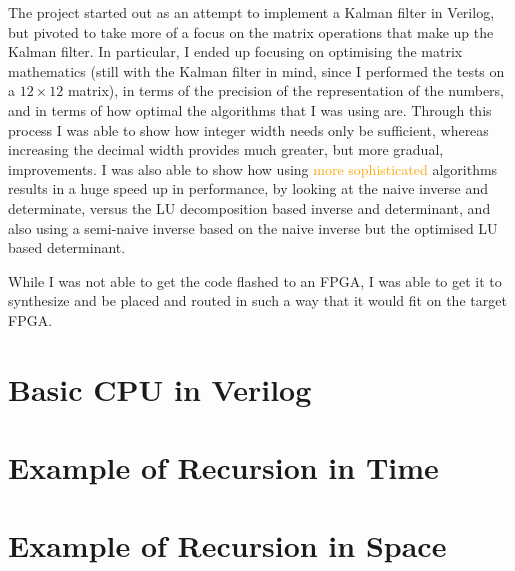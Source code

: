 \documentclass[12pt]{article}
\newcommand{\change}[2][]{\textcolor{orange}{#2}}
\begin{document}
The project started out as an attempt to implement a Kalman filter in Verilog, but pivoted to take more of a focus on the matrix operations that make up the Kalman filter. In particular, I ended up focusing on optimising the matrix mathematics (still with the Kalman filter in mind, since I performed the tests on a $12 \times 12$ matrix), in terms of the precision of the representation of the numbers, and in terms of how optimal the algorithms that I was using are. Through this process I was able to show how integer width needs only be sufficient, whereas increasing the decimal width provides much greater, but more gradual, improvements. I was also able to show how using \change[was "the correct" for which my concern is it sounds like the alternative is incorrect algorithms, which is not what you were referring to]{more sophisticated} algorithms results in a huge speed up in performance, by looking at the naive inverse and determinate, versus the LU decomposition based inverse and determinant, and also using a semi-naive inverse based on the naive inverse but the optimised LU based determinant.

While I was not able to get the code flashed to an FPGA, I was able to get it to synthesize and be placed and routed in such a way that it would fit on the target FPGA.

\printbibliography

\appendix

\renewcommand{\thesection}{Appendix \Alph{section}}

\section{Basic CPU in Verilog}
\label{verilog_cpu}



\section{Example of Recursion in Time}
\label{recursion_time}



\section{Example of Recursion in Space}
\label{recursion_space}


\end{document}
